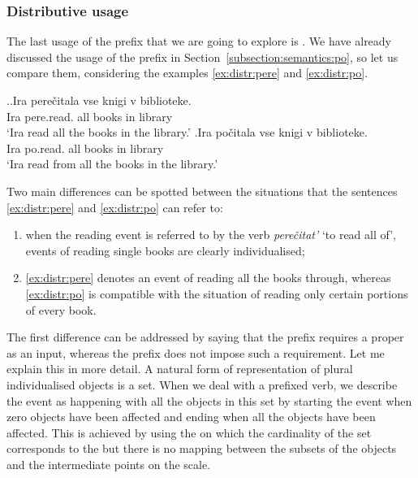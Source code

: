 \subsubsection{Distributive usage}
The last usage of the prefix  that we are going to explore is . We have already discussed the  usage of the prefix  in Section~\ref{subsection:semantics:po}, so let us compare them, considering the examples \ref{ex:distr:pere} and \ref{ex:distr:po}.

\ex.\ag.\label{ex:distr:pere}Ira pere\v{c}itala vse knigi v biblioteke.\\
Ira pere.read. all books in library\\
\trans `Ira read all the books in the library.'
\bg.\label{ex:distr:po}Ira po\v{c}itala vse knigi v biblioteke.\\
Ira po.read. all books in library\\
\trans `Ira read from all the books in the library.'

Two main differences can be spotted between the situations that the sentences \ref{ex:distr:pere} and \ref{ex:distr:po} can refer to:\largerpage
\begin{enumerate}
\item when the reading event is referred to by the verb \textit{pere\v{c}itat'} `to read all of', events of reading single books are clearly individualised;
\item \ref{ex:distr:pere} denotes an event of reading all the books through, whereas \ref{ex:distr:po} is compatible with the situation of reading only certain portions of every book.
\end{enumerate}

The first difference can be addressed by saying that the prefix  requires a proper  as an input, whereas the prefix  does not impose such a requirement. Let me explain this in more detail. A natural form of representation of plural individualised objects is a set. When we deal with a prefixed verb, we describe the event as happening with all the objects in this set by starting the event when zero objects have been affected and ending when all the objects have been affected. This is achieved by using the  on which the cardinality of the set corresponds to the  but there is no mapping between the subsets of the objects and the intermediate points on the scale.

